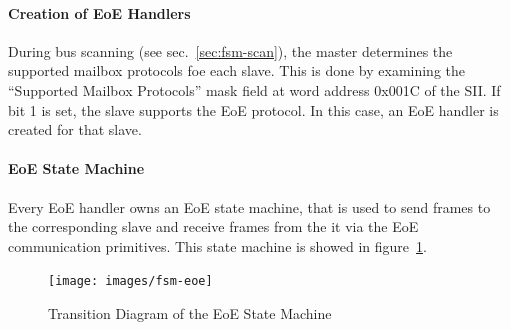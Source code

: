 \documentclass[a4paper,12pt,BCOR6mm,bibtotoc,idxtotoc]{scrbook}
\begin{document}
\paragraph{Creation of EoE Handlers}

During bus scanning (see sec.~\ref{sec:fsm-scan}), the master determines the
supported mailbox protocols foe each slave. This is done by examining the
``Supported Mailbox Protocols'' mask field at word address 0x001C of the
SII. If bit 1 is set, the slave supports the EoE protocol. In this
case, an EoE handler is created for that slave.

\paragraph{EoE State Machine}

Every EoE handler owns an EoE state machine, that is used to send frames to
the corresponding slave and receive frames from the it via the EoE
communication primitives. This state machine is showed in
figure~\ref{fig:fsm-eoe}.

\begin{figure}[htbp]
  \centering
  \texttt{[image: images/fsm-eoe]} %
  \caption{Transition Diagram of the EoE State Machine}
  \label{fig:fsm-eoe}
\end{figure}

\end{document}
